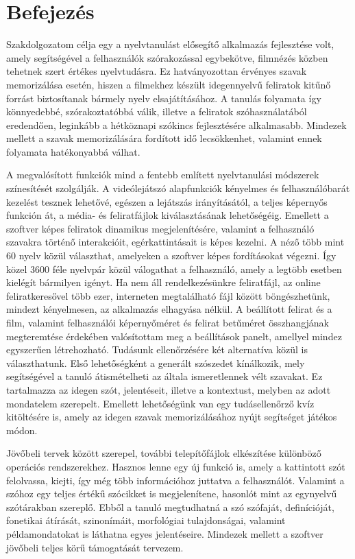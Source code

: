 \chapter*{Befejezés}

Szakdolgozatom célja egy a nyelvtanulást elősegítő alkalmazás fejlesztése volt, amely segítségével a felhasználók szórakozással egybekötve, filmnézés közben tehetnek szert értékes nyelvtudásra. Ez hatványozottan érvényes szavak memorizálása esetén, hiszen a filmekhez készült idegennyelvű feliratok kitűnő forrást biztosítanak bármely nyelv elsajátításához. A tanulás folyamata így könnyedebbé, szórakoztatóbbá válik, illetve a feliratok szóhasználatából eredendően, leginkább a hétköznapi szókincs fejlesztésére alkalmasabb. Mindezek mellett a szavak memorizálására fordított idő lecsökkenhet, valamint ennek folyamata hatékonyabbá válhat. 

A megvalósított funkciók mind a fentebb említett nyelvtanulási módszerek színesítését szolgálják. A videólejátszó alapfunkciók kényelmes és felhasználóbarát kezelést tesznek lehetővé, egészen a lejátszás irányításától, a teljes képernyős funkción át, a média- és feliratfájlok kiválasztásának lehetőségéig. Emellett a szoftver képes feliratok dinamikus megjelenítésére, valamint a felhasználó szavakra történő interakcióit, egérkattintásait is képes kezelni. A néző több mint 60 nyelv közül választhat, amelyeken a szoftver képes fordításokat végezni. Így közel 3600 féle nyelvpár közül válogathat a felhasználó, amely a legtöbb esetben kielégít bármilyen igényt. Ha nem áll rendelkezésünkre feliratfájl, az online feliratkeresővel több ezer, interneten megtalálható fájl között böngészhetünk, mindezt kényelmesen, az alkalmazás elhagyása nélkül. A beállított felirat és a film, valamint felhasználói képernyőméret és felirat betűméret összhangjának megteremtése érdekében valósítottam meg a beállítások panelt, amellyel mindez egyszerűen létrehozható. Tudásunk ellenőrzésére két alternatíva közül is választhatunk. Első lehetőségként a generált szószedet kínálkozik, mely segítségével a tanuló átismételheti az általa ismeretlennek vélt szavakat. Ez tartalmazza az idegen szót, jelentéseit, illetve a kontextust, melyben az adott mondatelem szerepelt. Emellett lehetőségünk van egy tudásellenőrző kvíz kitöltésére is, amely az idegen szavak memorizálásához nyújt segítséget játékos módon.

Jövőbeli tervek között szerepel, további telepítőfájlok elkészítése különböző operációs rendszerekhez. Hasznos lenne egy új funkció is, amely a kattintott szót felolvassa, kiejti, így még több információhoz juttatva a felhasználót. Valamint a szóhoz egy teljes értékű szócikket is megjelenítene, hasonlót mint az egynyelvű szótárakban szereplő. Ebből a tanuló megtudhatná a szó szófaját, definícióját, fonetikai átírását, szinonímáit, morfológiai tulajdonságai, valamint példamondatokat is láthatna egyes jelentéseire. Mindezek mellett a szoftver jövőbeli teljes körű támogatását tervezem.
